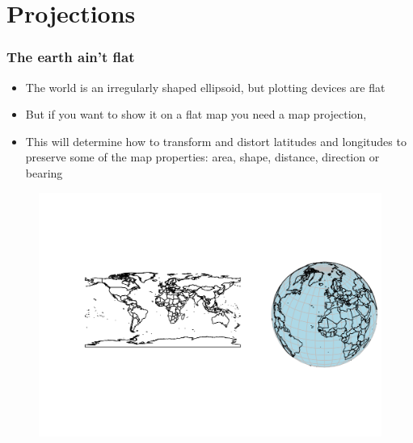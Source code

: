 \documentclass[
  shownotes,
  xcolor={svgnames},
  hyperref={colorlinks,citecolor=DarkBlue,linkcolor=DarkRed,urlcolor=DarkBlue}
  ]{beamer}
\begin{document}
\section{Projections}
\begin{frame}[fragile]
\frametitle{The earth ain't flat}
\begin{itemize}
	\footnotesize
	\item The world is an irregularly shaped ellipsoid, but plotting devices are flat
	\medskip
	\item But if you want to show it on a flat map you need a map projection, 
	\medskip
	\item This  will determine how to transform and distort latitudes and longitudes to preserve some of the map properties: area, shape, distance, direction or bearing
\end{itemize}

\begin{figure}[H] \centering
            \captionsetup{justification=centering}
				\includegraphics[scale=0.6]{figures/world-1.png}
 \end{figure}

\end{frame}
\end{document}
